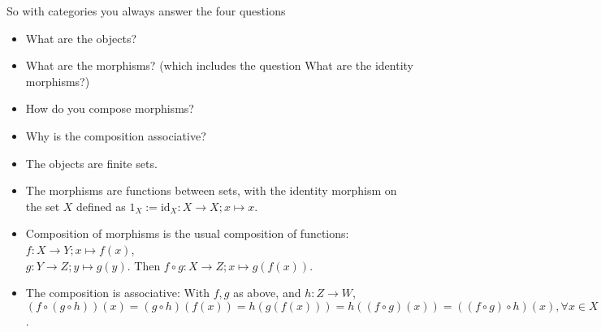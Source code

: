 \noindent So with categories you always answer the four questions
\begin{itemize}\label{category_questions}
\item What are the objects?
\item What are the morphisms? (which includes the question What are the identity morphisms?)
\item How do you compose morphisms?
\item Why is the composition associative?
\end{itemize}

\begin{example}\phantom{}
\begin{itemize}
\item The objects are finite sets.
\item The morphisms are functions between sets, with the identity morphism on the set $X$ defined as $1_{X} := \mathrm{id}_{X} : X \rightarrow X; x \mapsto x$.
\item Composition of morphisms is the usual composition of functions: $f : X \rightarrow Y; x \mapsto f(x)$, \\
$g : Y \rightarrow Z; y \mapsto g(y)$. Then $f \circ g : X \rightarrow Z; x \mapsto g(f(x))$.
\item The composition is associative: With $f, g$ as above, and $h : Z \rightarrow W$, $(f \circ(g \circ h)) (x) = (g \circ h)(f(x)) = h(g(f(x)))
= h((f \circ g)(x)) = ((f \circ g) \circ h)(x), \forall x \in X$.
\end{itemize}
\end{example}


